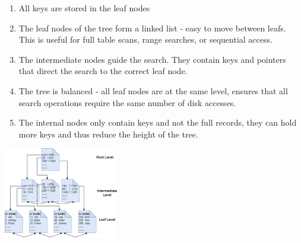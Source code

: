\begin{enumerate}[noitemsep,leftmargin=*]
\item{All keys are stored in the leaf nodes}
\item{The leaf nodes of the tree form a linked list - easy to move between leafs. This is useful for full table scans, range searches, or sequential access.}
\item{The intermediate nodes guide the search. They contain keys and pointers that direct the search to the correct leaf node.}
\item{The tree is balanced - all leaf nodes are at the same level, ensures that all search operations require the same number of disk accesses.}
\item{The internal nodes only contain keys and not the full records, they can hold more keys and thus reduce the height of the tree.}
\end{enumerate}


\begin{center}
\includegraphics[width=5cm]{memory_related/b_tree/b_tree_img}
\end{center}

